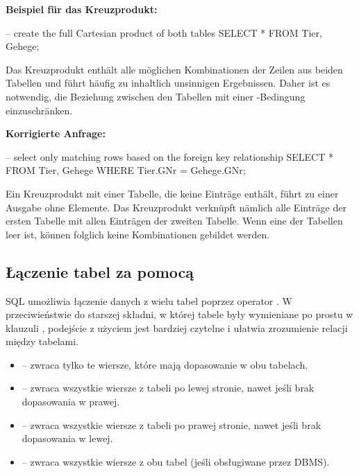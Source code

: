     \textbf{Beispiel für das Kreuzprodukt:}
    \begin{sql}
    -- create the full Cartesian product of both tables
    SELECT *
        FROM Tier, Gehege;
    \end{sql}

    \begin{tcolorbox}[gray={Hinweis zum Kreuzprodukt}]
    Das Kreuzprodukt enthält alle möglichen Kombinationen der Zeilen aus beiden Tabellen
    und führt häufig zu inhaltlich unsinnigen Ergebnissen.  
    Daher ist es notwendig, die Beziehung zwischen den Tabellen mit einer -Bedingung
    einzuschränken.
    \end{tcolorbox}

    \textbf{Korrigierte Anfrage:}
    \begin{sql}
    -- select only matching rows based on the foreign key relationship
    SELECT *
        FROM Tier, Gehege
        WHERE Tier.GNr = Gehege.GNr;
    \end{sql}

\begin{tcolorbox}[red = {Hinweis}]
    Ein Kreuzprodukt mit einer Tabelle, die keine Einträge enthält, führt zu einer Ausgabe ohne Elemente. Das Kreuzprodukt verknüpft nämlich alle Einträge der ersten Tabelle mit allen Einträgen der zweiten Tabelle. Wenn eine der Tabellen leer ist, können folglich keine Kombinationen gebildet werden.
\end{tcolorbox}

\subsection{Łączenie tabel za pomocą }

SQL umożliwia łączenie danych z wielu tabel poprzez operator .  
W przeciwieństwie do starszej składni, w której tabele były wymieniane po prostu w klauzuli ,  
podejście z użyciem  jest bardziej czytelne i ułatwia zrozumienie relacji między tabelami.

\begin{itemize}
    \item {} – zwraca tylko te wiersze, które mają dopasowanie w obu tabelach.
    \item {} – zwraca wszystkie wiersze z tabeli po lewej stronie, nawet jeśli brak dopasowania w prawej.
    \item {} – zwraca wszystkie wiersze z tabeli po prawej stronie, nawet jeśli brak dopasowania w lewej.
    \item {} – zwraca wszystkie wiersze z obu tabel (jeśli obsługiwane przez DBMS).
\end{itemize}

